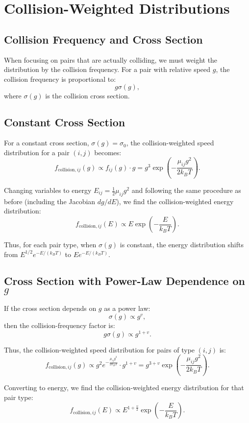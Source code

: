 \section{Collision-Weighted Distributions}

\subsection{Collision Frequency and Cross Section}

When focusing on pairs that are actually colliding, we must weight the distribution by the collision frequency. For a pair with relative speed \( g \), the collision frequency is proportional to:
\[
g \sigma(g),
\]
where \(\sigma(g)\) is the collision cross section.

\subsection{Constant Cross Section}

For a constant cross section, \(\sigma(g)=\sigma_0\), the collision-weighted speed distribution for a pair \( (i,j) \) becomes:
\[
f_{\text{collision},ij}(g) \propto f_{ij}(g) \cdot g = g^{3} \exp\left(-\frac{\mu_{ij} g^{2}}{2 k_B T}\right).
\]

Changing variables to energy \( E_{ij} = \frac{1}{2}\mu_{ij} g^{2} \) and following the same procedure as before (including the Jacobian \( dg/dE \)), we find the collision-weighted energy distribution:
\[
f_{\text{collision},ij}(E) \propto E \exp\left(-\frac{E}{k_B T}\right).
\]

Thus, for each pair type, when \(\sigma(g)\) is constant, the energy distribution shifts from \( E^{1/2} e^{-E/(k_B T)} \) to \( E e^{-E/(k_B T)} \).

\subsection{Cross Section with Power-Law Dependence on \( g \)}

If the cross section depends on \( g \) as a power law:
\[
\sigma(g) \propto g^{v},
\]
then the collision-frequency factor is:
\[
g \sigma(g) \propto g^{1+v}.
\]

Thus, the collision-weighted speed distribution for pairs of type \( (i,j) \) is:
\[
f_{\text{collision},ij}(g) \propto g^{2} e^{-\frac{\mu_{ij} g^{2}}{2 k_B T}} \cdot g^{1+v} = g^{3+v} \exp\left(-\frac{\mu_{ij} g^{2}}{2 k_B T}\right).
\]

Converting to energy, we find the collision-weighted energy distribution for that pair type:
\[
f_{\text{collision},ij}(E) \propto E^{1 + \frac{v}{2}} \exp\left(-\frac{E}{k_B T}\right).
\]

